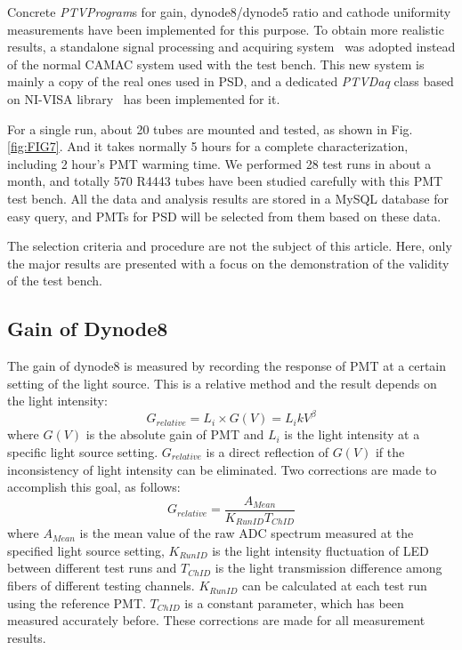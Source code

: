 \documentclass[preprint, times]{elsarticle}
\begin{document}
Concrete \textit{PTVProgram}s for gain, dynode8/dynode5 ratio and cathode uniformity measurements have been implemented for this purpose.
To obtain more realistic results, a standalone signal processing and acquiring system~\cite{fee} was adopted instead of the normal CAMAC system used with the test bench. 
This new system is mainly a copy of the real ones used in PSD, and a dedicated \textit{PTVDaq} class based on NI-VISA library~\cite{ni_visa} has been implemented for it.

For a single run, about 20 tubes are mounted and tested, as shown in Fig.\ref{fig:FIG7}.
And it takes normally 5 hours for a complete characterization, including 2 hour's PMT warming time. 
We performed 28 test runs in about a month, and totally 570 R4443 tubes have been studied carefully with this PMT test bench. 
All the data and analysis results are stored in a MySQL database for easy query, and PMTs for PSD will be selected from them based on these data.

The selection criteria and procedure are not the subject of this article.
Here, only the major results are presented with a focus on the demonstration of the validity of the test bench. 

\subsection{Gain of Dynode8}
\label{sec:psd_gain}

The gain of dynode8 is measured by recording the response of PMT at a certain setting of the light source. 
This is a relative method and the result depends on the light intensity:
\begin{equation}
 G_{relative} = L_i \times G(V) = L_i k V^\beta
\end{equation}
where $G(V)$ is the absolute gain of PMT and $L_i$ is the light intensity at a specific light source setting.
$G_{relative}$ is a direct reflection of $G(V)$ if the inconsistency of light intensity can be eliminated.
Two corrections are made to accomplish this goal, as follows: 
\begin{equation}
 G_{relative} = \frac{A_{Mean}}{K_{RunID} T_{ChID}}
\end{equation} 
where $A_{Mean}$ is the mean value of the raw ADC spectrum measured at the specified light source setting,
$K_{RunID}$ is the light intensity fluctuation of LED between different test runs and $T_{ChID}$ is the light transmission difference among fibers of different testing channels.
$K_{RunID}$ can be calculated at each test run using the reference PMT.
$T_{ChID}$ is a constant parameter, which has been measured accurately before.
These corrections are made for all measurement results.
\end{document}
